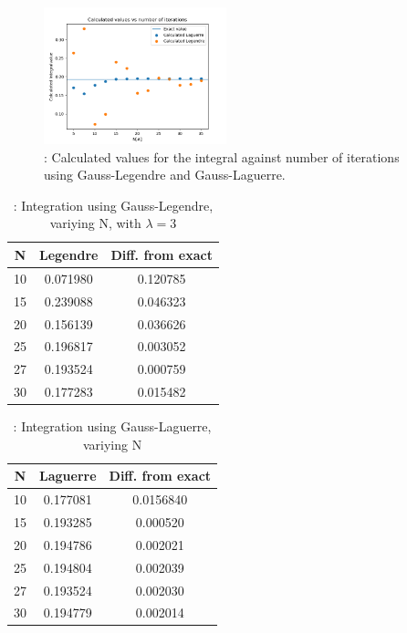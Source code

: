 \documentclass{article}
\begin{document}
\begin{figure}[hbt]
\begin{center}
    \includegraphics[width=200px]{Leg_lag_int.png}
    \caption{: Calculated values for the integral against number of iterations using Gauss-Legendre and Gauss-Laguerre.}
    \label{fig:int}
\end{center}
\end{figure}

\begin{table}[h!]
  \caption{: Integration using Gauss-Legendre, variying N, with $\lambda=3$ }
  \begin{tabular}{c c c}
    N & Legendre & Diff. from exact \\
    \hline
    10 & 0.071980 & 0.120785 \\
    15 & 0.239088 & 0.046323 \\
    20 & 0.156139 & 0.036626 \\
    25 & 0.196817 & 0.003052 \\
    27 & 0.193524 & 0.000759 \\
    30 & 0.177283 & 0.015482 \\
  \end{tabular}
  \label{Tab: Legendre}
\end{table}

\begin{table}[h!]
  \caption{: Integration using Gauss-Laguerre, variying N}
  \begin{tabular}{c c c}
    N & Laguerre & Diff. from exact \\
    \hline
    10 & 0.177081 & 0.0156840 \\
    15 & 0.193285 & 0.000520 \\
    20 & 0.194786 & 0.002021 \\
    25 & 0.194804 & 0.002039 \\
    27 & 0.193524 & 0.002030 \\
    30 & 0.194779 & 0.002014 \\
  \end{tabular}
  \label{Tab: Laguerre}
\end{table}
\end{document}
